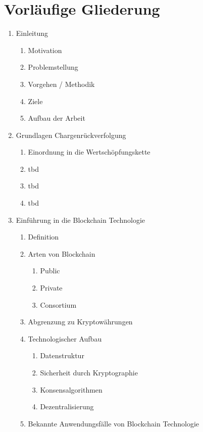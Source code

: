 \section{Vorläufige Gliederung}
\begin{small}
  \begin{enumerate}
    \item Einleitung
    \begin{enumerate}[label*=\arabic*.]
      \item Motivation
      \item Problemstellung
      \item Vorgehen / Methodik
      \item Ziele
      \item Aufbau der Arbeit
    \end{enumerate}
    \item Grundlagen Chargenrückverfolgung
    \begin{enumerate}[label*=\arabic*.]
      \item Einordnung in die Wertschöpfungskette
      \item tbd
      \item tbd
      \item tbd
    \end{enumerate}
    \item Einführung in die Blockchain Technologie
    \begin{enumerate}[label*=\arabic*.]
      \item Definition
      \item Arten von Blockchain
      \begin{enumerate}[label*=\arabic*.]
        \item Public
        \item Private
        \item Consortium
      \end{enumerate}
      \item Abgrenzung zu Kryptowährungen
      \item Technologischer Aufbau
      \begin{enumerate}[label*=\arabic*.]
        \item Datenstruktur
        \item Sicherheit durch Kryptographie
        \item Konsensalgorithmen
        \item Dezentralisierung
      \end{enumerate}
      \item Bekannte Anwendungsfälle von Blockchain Technologie

\end{enumerate}
\end{enumerate}
\end{small}
